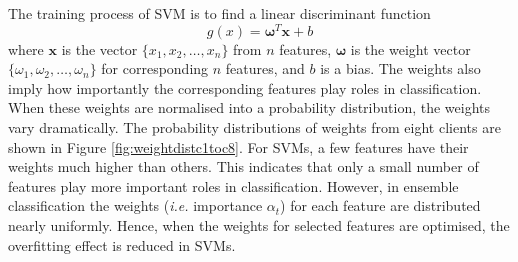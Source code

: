 \documentclass[a4paper,10pt]{article}
\begin{document}
The training process of SVM is to find a linear discriminant function
\begin{equation}
 g(x)=\mathbf{\omega}^T \mathbf{x} + b
\end{equation}
where $\mathbf{x}$ is the vector $\{x_1,x_2,\ldots,x_n\}$ from $n$ features, $\mathbf{\omega}$ is the weight vector $\{\omega_1,\omega_2,\ldots,\omega_n\}$ for corresponding $n$ features, and $b$ is a bias. The weights also imply how importantly the corresponding features play roles in classification. When these weights are normalised into a probability distribution, the weights vary dramatically. The probability distributions of weights from eight clients are shown in \mbox{Figure} \ref{fig:weightdistc1toc8}. For SVMs, a few features have their weights much higher than others. This indicates that only a small number of features play more important roles in classification. However, in ensemble classification the weights (\textit{i.e.} importance $\alpha_{t}$) for each feature are distributed nearly uniformly. Hence, when the weights for selected features are optimised, the overfitting effect is reduced in SVMs.
\end{document}
